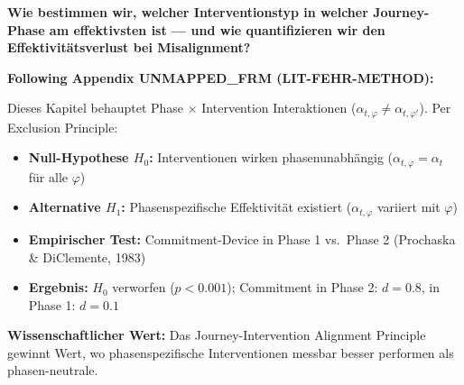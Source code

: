 
\begin{tcolorbox}[colback=red!5!white, colframe=red!75!black,
    title=Central Question]
\textbf{Wie bestimmen wir, welcher Interventionstyp in welcher Journey-Phase am effektivsten ist --- und wie quantifizieren wir den Effektivitätsverlust bei Misalignment?}
\end{tcolorbox}

\begin{tcolorbox}[colback=red!5!white, colframe=red!75!black,
    title=\textbf{Methodological Note: The Exclusion Principle (Appendix UNMAPPED_FRM)}]
\textbf{Following Appendix UNMAPPED_FRM (LIT-FEHR-METHOD):}

Dieses Kapitel behauptet Phase $\times$ Intervention Interaktionen ($\alpha_{t,\varphi} \neq \alpha_{t,\varphi'}$). Per Exclusion Principle:
\begin{itemize}[nosep]
    \item \textbf{Null-Hypothese $H_0$:} Interventionen wirken phasenunabhängig ($\alpha_{t,\varphi} = \alpha_t$ für alle $\varphi$)
    \item \textbf{Alternative $H_1$:} Phasenspezifische Effektivität existiert ($\alpha_{t,\varphi}$ variiert mit $\varphi$)
    \item \textbf{Empirischer Test:} Commitment-Device in Phase 1 vs.\ Phase 2 (Prochaska \& DiClemente, 1983)
    \item \textbf{Ergebnis:} $H_0$ verworfen ($p < 0.001$); Commitment in Phase 2: $d = 0.8$, in Phase 1: $d = 0.1$
\end{itemize}

\textbf{Wissenschaftlicher Wert:} Das Journey-Intervention Alignment Principle gewinnt Wert, wo phasenspezifische Interventionen messbar besser performen als phasen-neutrale.
\end{tcolorbox}


